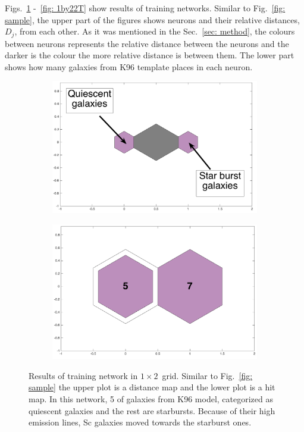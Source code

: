             Figs.~\ref{fig: 1by2T} -~\ref{fig: 1by22T} show results of training networks.
            Similar to Fig.~\ref{fig: sample}, the upper part of the figures shows neurons and their relative distances, $D_j$, from each other.
            As it was mentioned in the Sec.~\ref{sec: method}, the colours between neurons represents the relative distance between the neurons and the darker is the colour the more relative distance is between them.
            The lower part shows how many galaxies from K96 template places in each neuron. 
            \begin{figure}
                \begin{subfigure}[b]{0.5\textwidth}
                    \centering
                    \includegraphics[width=\textwidth]{../images0.01/1d/dist_1_by_2.png}
                \end{subfigure}
                \hfill
                \begin{subfigure}[b]{0.5\textwidth}
                     \includegraphics[width=\textwidth]{../images0.01/1d/hit_t_1_by_2.png}
                \end{subfigure}
                \caption{Results of training network in $1\times2$~grid. Similar to Fig.~\ref{fig: sample} the upper plot is a distance map and the lower plot is a hit map. In this network, 5 of galaxies from K96 model, categorized as quiescent galaxies and the rest are starbursts. Because of their high emission lines, Sc galaxies moved towards the starburst ones.}
                 \label{fig: 1by2T}
            \end{figure}
        
